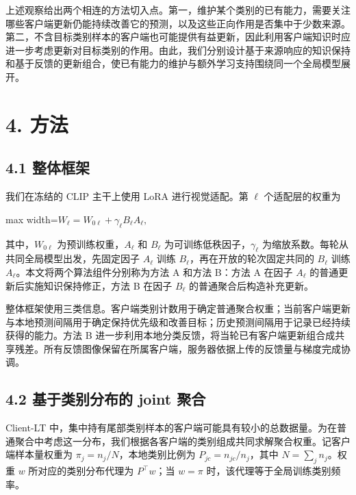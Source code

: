 \documentclass[UTF8,a4paper,10pt,fontset=fandol]{ctexart}
\begin{document}
上述观察给出两个相连的方法切入点。第一，维护某个类别的已有能力，需要关注哪些客户端更新仍能持续改善它的预测，以及这些正向作用是否集中于少数来源。第二，不含目标类别样本的客户端也可能提供有益更新，因此利用客户端知识时应进一步考虑更新对目标类别的作用。由此，我们分别设计基于来源响应的知识保持和基于反馈的更新组合，使已有能力的维护与额外学习支持围绕同一个全局模型展开。


\section*{4. 方法}

\subsection*{4.1 整体框架}

我们在冻结的 CLIP 主干上使用 LoRA 进行视觉适配。第 $\ell$ 个适配层的权重为


\begin{center}\begin{adjustbox}{max width=\linewidth}$\displaystyle W_\ell=W_{0\ell}+\gamma_\ell B_\ell A_\ell,$\end{adjustbox}\end{center}

其中，$W_{0\ell}$ 为预训练权重，$A_\ell$ 和 $B_\ell$ 为可训练低秩因子，$\gamma_\ell$ 为缩放系数。每轮从共同全局模型出发，先固定因子 $A_\ell$ 训练 $B_\ell$，再在开放的轮次固定共同的 $B_\ell$ 训练 $A_\ell$。本文将两个算法组件分别称为方法 A 和方法 B：方法 A 在因子 $A_\ell$ 的普通更新后实施知识保持修正，方法 B 在因子 $B_\ell$ 的普通聚合后构造补充更新。


整体框架使用三类信息。客户端类别计数用于确定普通聚合权重；当前客户端更新与本地预测间隔用于确定保持优先级和改善目标；历史预测间隔用于记录已经持续获得的能力。方法 B 进一步利用本地分类反馈，将当轮已有客户端更新组合成共享残差。所有反馈图像保留在所属客户端，服务器依据上传的反馈量与梯度完成协调。


\subsection*{4.2 基于类别分布的 joint 聚合}

Client-LT 中，集中持有尾部类别样本的客户端可能具有较小的总数据量。为在普通聚合中考虑这一分布，我们根据各客户端的类别组成共同求解聚合权重。记客户端样本量权重为 $\pi_j=n_j/N$，本地类别比例为 $P_{jc}=n_{jc}/n_j$，其中 $N=\sum_jn_j$。权重 $w$ 所对应的类别分布代理为 $P^\top w$；当 $w=\pi$ 时，该代理等于全局训练类别频率。
\end{document}
